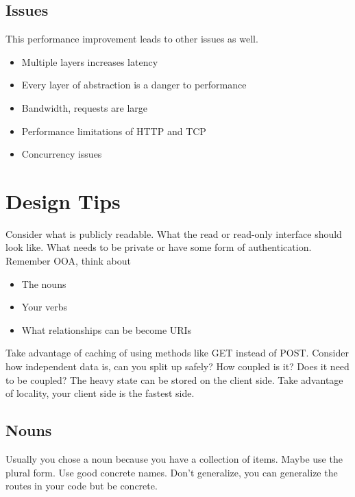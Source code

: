 \documentclass[../CMPUT-404-Notes.tex]{subfiles}
\begin{document}
\subsection{Issues}
This performance improvement leads to other issues as well.
\begin{itemize}
  \item Multiple layers increases latency
  \item Every layer of abstraction is a danger to performance
  \item Bandwidth, requests are large
  \item Performance limitations of HTTP and TCP
  \item Concurrency issues
\end{itemize}


\section{Design Tips}
Consider what is publicly readable. What the read or read-only interface should look like.
What needs to be private or have some form of authentication.
Remember OOA, think about
\begin{itemize}
  \item The nouns
  \item Your verbs
  \item What relationships can be become URIs
\end{itemize}

Take advantage of caching of using methods like GET instead of POST.
Consider how independent data is, can you split up safely? How coupled is it? Does it need to be coupled?
The heavy state can be stored on the client side. Take advantage of locality, your client side is the fastest side.

\subsection{Nouns}
Usually you chose a noun because you have a collection of items. Maybe use the plural form.
Use good concrete names. Don't generalize, you can generalize the routes in your code but be concrete.
\end{document}
